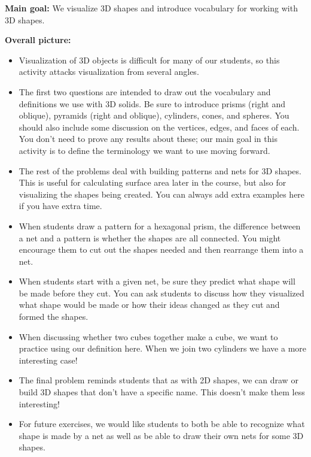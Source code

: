 \documentclass[nooutcomes,noauthor]{ximera}
\begin{document}
\begin{instructorNotes} 


{\bf Main goal:} We visualize 3D shapes and introduce vocabulary for working with 3D shapes.

{\bf Overall picture:} 


\begin{itemize}
	\item Visualization of 3D objects is difficult for many of our students, so this activity attacks visualization from several angles.
	\item The first two questions are intended to draw out the vocabulary and definitions we use with 3D solids. Be sure to introduce prisms (right and oblique), pyramids (right and oblique), cylinders, cones, and spheres. You should also include some discussion on the vertices, edges, and faces of each. You don't need to prove any results about these; our main goal in this activity is to define the terminology we want to use moving forward.
	\item The rest of the problems deal with building patterns and nets for 3D shapes. This is useful for calculating surface area later in the course, but also for visualizing the shapes being created. You can always add extra examples here if you have extra time.
	\item When students draw a pattern for a hexagonal prism, the difference between a net and a pattern is whether the shapes are all connected. You might encourage them to cut out the shapes needed and then rearrange them into a net.
	\item When students start with a given net, be sure they predict what shape will be made before they cut. You can ask students to discuss how they visualized what shape would be made or how their ideas changed as they cut and formed the shapes.
	\item When discussing whether two cubes together make a cube, we want to practice using our definition here. When we join two cylinders we have a more interesting case!
	\item The final problem reminds students that as with 2D shapes, we can draw or build 3D shapes that don't have a specific name. This doesn't make them less interesting!
	\item For future exercises, we would like students to both be able to recognize what shape is made by a net as well as be able to draw their own nets for some 3D shapes.

\end{itemize}








\end{instructorNotes}
\end{document}
